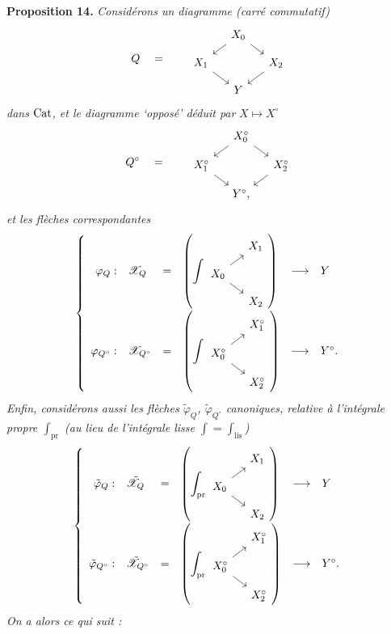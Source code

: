 \textbf{Proposition 14.} \textit{Considérons un diagramme (carré commutatif)}
\[
Q \quad = \qquad
\begin{tikzcd}[row sep=small, column sep=small]
 & X_0 \arrow[dl] \arrow[dr] & \\
X_1 \arrow[dr] & & X_2 \arrow[dl] \\
 & Y &
\end{tikzcd}
\]
\textit{dans} $\mathrm{Cat}$\textit{, et le diagramme `opposé' déduit par} $X\longmapsto X^\circ$
\[
Q^\circ \quad = \qquad
\begin{tikzcd}[row sep=small, column sep=small]
 & X_0^\circ \arrow[dl] \arrow[dr] & \\
X_1^\circ \arrow[dr] & & X_2^\circ \arrow[dl] \\
 & Y^\circ, &
\end{tikzcd}
\]
\textit{et les flèches correspondantes}
\[
\left\{
\begin{array}{rlclcl}
\varphi_Q : & \sX_Q & = &
\left(\displaystyle\int
\begin{tikzcd}[ampersand replacement=\&, row sep=small, column sep=small]
 \& X_1 \\
X_0 \arrow[ur] \arrow[dr] \& \\
 \& X_2
\end{tikzcd}
\right)
& \longrightarrow & Y \\[2ex]
\varphi_{Q^\circ} : & \sX_{Q^\circ} & = &
\left(\displaystyle\int
\begin{tikzcd}[ampersand replacement=\&, row sep=small, column sep=small]
 \& X_1^\circ \\
X_0^\circ \arrow[ur] \arrow[dr] \& \\
 \& X_2^\circ
\end{tikzcd}
\right)
& \longrightarrow & Y^\circ.
\end{array}
\right.
\]
\textit{Enfin, considérons aussi les flèches $\tilde{\varphi}_Q$, $\tilde{\varphi}_{Q^\circ}$ canoniques, relative à l'intégrale propre $\int_{\mathrm{pr}}$} %
\textit{(au lieu de l'intégrale lisse $\int=\int_{\mathrm{lis}}$)}
\[
\left\{
\begin{array}{rlclcl}
\tilde{\varphi}_Q : & \tsX_Q & = &
\left(\displaystyle\int_{\mathrm{pr}}
\begin{tikzcd}[ampersand replacement=\&, row sep=small, column sep=small]
 \& X_1 \\
X_0 \arrow[ur] \arrow[dr] \& \\
 \& X_2
\end{tikzcd}
\right)
& \longrightarrow & Y \\[2ex]
\tilde{\varphi}_{Q^\circ} : & \tsX_{Q^\circ} & = &
\left(\displaystyle\int_{\mathrm{pr}}
\begin{tikzcd}[ampersand replacement=\&, row sep=small, column sep=small]
 \& X_1^\circ \\
X_0^\circ \arrow[ur] \arrow[dr] \& \\
 \& X_2^\circ
\end{tikzcd}
\right)
& \longrightarrow & Y^\circ.
\end{array}
\right.
\]
\textit{On a alors ce qui suit :}

